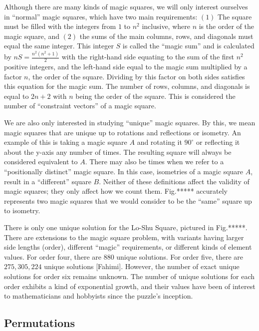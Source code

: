 \documentclass{rhumj_new}
\begin{document}
Although there are many kinds of magic squares, we will only interest ourselves in ``normal''
magic squares, which have two main requirements: $(1)$ The square must be filled with the integers
from $1$ to $n^2$ inclusive, where $n$ is the order of the magic square, and $(2)$ the sums of the
main columns, rows, and diagonals must equal the same integer. This integer $S$ is called the
``magic sum'' and is calculated by $nS = \frac{n^2(n^{2}+1)}{2}$ with the right-hand side equating
to the sum of the first $n^2$ positive integers, and the left-hand side equal to the magic sum
multiplied by a factor $n$, the order of the square. Dividing by this factor on both sides
satisfies this equation for the magic sum. The number of rows, columns, and diagonals is equal to
$2n+2$ with $n$ being the order of the square. This is considered the number of ``constraint
vectors'' of a magic square.

We are also only interested in studying ``unique'' magic squares. By this, we mean magic
squares that are unique up to rotations and reflections or isometry. An example of this is taking a
magic square $A$ and rotating it $90^{\circ }$ or reflecting it about the y-axis any number of
times. The resulting square will always be considered equivalent to $A$. There may also be times
when we refer to a ``positionally distinct'' magic square. In this case, isometries of a magic
square $A$, result in a ``different'' square $B$. Neither of these definitions affect the validity
of magic squares; they only affect how we count them. Fig.***** accurately represents
two magic squares that we would consider to be the ``same'' square up to isometry.

There is only one unique solution for the Lo-Shu Square, pictured in Fig.*****.
There are extensions to the magic square problem, with variants having larger side lengths (order),
different ``magic'' requirements, or different kinds of element values. For order four, there are
$880$ unique solutions. For order five, there are $275,305,224$ unique solutions [Fahimi]. However,
the number of exact unique solutions for order six remains unknown. The number of unique solutions
for each order exhibits a kind of exponential growth, and their values have been of interest to
mathematicians and hobbyists since the puzzle's inception.

\subsection{Permutations}
\end{document}
